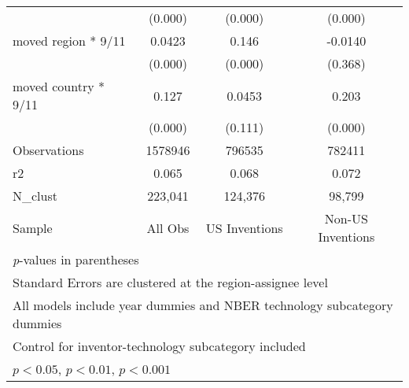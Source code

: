 {\begin{longtable}{l*{3}{c}}
                &  (0.000)         &  (0.000)         &  (0.000)         \\
moved region * 9/11&   0.0423\sym{***}&    0.146\sym{***}&  -0.0140         \\
                &  (0.000)         &  (0.000)         &  (0.368)         \\
moved country * 9/11&    0.127\sym{***}&   0.0453         &    0.203\sym{***}\\
                &  (0.000)         &  (0.111)         &  (0.000)         \\
\hline
Observations    &  1578946         &   796535         &   782411         \\
r2              &    0.065         &    0.068         &    0.072         \\
N\_clust         &  223,041         &  124,376         &   98,799         \\
Sample          &  All Obs         &US Inventions         &Non-US Inventions         \\
\hline\hline
\multicolumn{4}{l}{\footnotesize \textit{p}-values in parentheses}\\
\multicolumn{4}{l}{\footnotesize Standard Errors are clustered at the region-assignee level}\\
\multicolumn{4}{l}{\footnotesize All models include year dummies and NBER technology subcategory dummies}\\
\multicolumn{4}{l}{\footnotesize Control for inventor-technology subcategory included}\\
\multicolumn{4}{l}{\footnotesize \sym{*} \(p<0.05\), \sym{**} \(p<0.01\), \sym{***} \(p<0.001\)}\\
\end{longtable}
}
